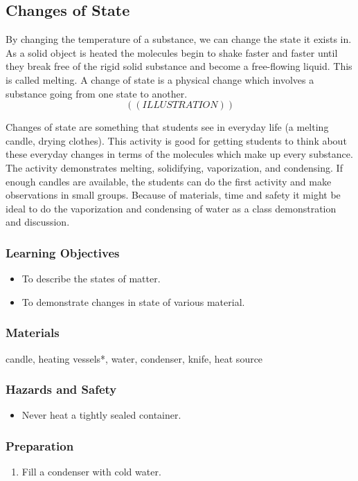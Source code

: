 \subsection{Changes of State}
By changing the temperature of a substance, we can change the state it exists in. As a solid object is heated the molecules begin to shake faster and faster until they break free of the rigid solid substance and become a free-flowing liquid. This is called melting. A change of state is a physical change which involves a substance going from one state to another. 
$$((ILLUSTRATION))$$

Changes of state are something that students see in everyday life (a melting candle, drying clothes). This activity is good for getting students to think about these everyday changes in terms of the molecules which make up every substance. The activity demonstrates melting, solidifying, vaporization, and condensing. If enough candles are available, the students can do the first activity and make observations in small groups. Because of materials, time and safety it might be ideal to do the vaporization and condensing of water as a class demonstration and discussion.

\subsubsection*{Learning Objectives}
\begin{itemize}
\item{To describe the states of matter.}
\item{To demonstrate changes in state of various material.}
\end{itemize}

\subsubsection*{Materials}
candle, heating vessels*, water, condenser, knife, heat source

\subsubsection*{Hazards and Safety}
\begin{itemize}
\item{Never heat a tightly sealed container.}
\end{itemize}

\subsubsection*{Preparation}
\begin{enumerate}
\item{Fill a condenser with cold water.}
\end{enumerate}

